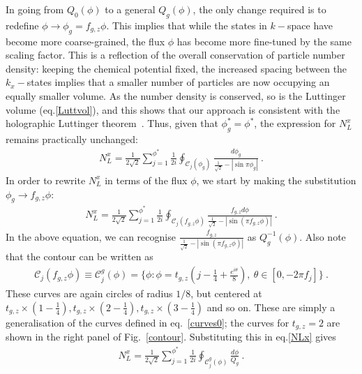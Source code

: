 In going from \(Q_0(\phi)\) to a general \(Q_g(\phi)\), the only change required is to redefine \(\phi \to \phi_g = f_{g,z}\phi\). This implies that while the states in \(k-\)space have become more coarse-grained, the flux \(\phi\) has become more fine-tuned by the same scaling factor.
This is a reflection of the overall conservation of particle number density: keeping the chemical potential fixed, the increased spacing between the \(k_x-\)states implies that a smaller number of particles are now occupying an equally smaller volume. As the number density is conserved, so is the Luttinger volume (eq.\eqref{Luttvol}), and this shows that our approach is consistent with the holographic Luttinger theorem~\cite{sachdev_2011}. Thus, given that \(\phi_g^* = \phi^*\), the expression for \(N_L^x\) remains practically unchanged:
\begin{equation}\begin{aligned}
	N_L^x = \frac{1}{2\sqrt 2}\sum_{j=1}^{\phi^*}\frac{1}{2 i}\oint_{\mathcal{C}_j(\phi_g)} \frac{d\phi_g}{\frac{1}{\sqrt 2} - |\sin \pi \phi_g|}~.
\end{aligned}\end{equation}
In order to rewrite $N_L^x$ in terms of the flux \(\phi\), we start by making the substitution \(\phi_g \to f_{g,z}\phi\):
\begin{equation}\label{NLx}\begin{aligned}
	N_L^x = \frac{1}{2\sqrt 2}\sum_{j=1}^{\phi^*}\frac{1}{2 i}\oint_{\mathcal{C}_j(f_{g,z}\phi)} \frac{f_{g,z} d\phi}{\frac{1}{\sqrt 2} - |\sin \left( \pi f_{g,z}\phi\right)| }~.
\end{aligned}\end{equation}
In the above equation, we can recognise  \(\frac{f_{g,z} }{\frac{1}{\sqrt 2} - |\sin \left( \pi f_{g,z}\phi\right)|}\) as \(Q_g^{-1}(\phi)\).
Also note that the contour can be written as
\begin{equation}\begin{aligned}
	\mathcal{C}_j(f_{g,z}\phi) \equiv \mathcal{C}^g_j(\phi) = \bigg\{\phi:\phi = t_{g,z}\left( j - \frac{1}{4} + \frac{e^{i\theta}}{8} \right),~\theta \in \left[0, -2\pi f_j\right]\bigg\}~.
\end{aligned}\end{equation}
These curves are again circles of radius \(1/8\), but centered at \(t_{g,z}\times \left( 1 - \frac{1}{4} \right) ,t_{g,z}\times \left( 2 - \frac{1}{4} \right) ,t_{g,z}\times \left( 3 - \frac{1}{4} \right) \) and so on. These are simply a generalisation of the curves defined in eq.~\eqref{curves0}; the curves for \(t_{g,z}=2\) are shown in the right panel of Fig.~\ref{contour}.
Substituting this in eq.\eqref{NLx} gives
\begin{equation}\begin{aligned}
	\label{Lut_volume}
	N_L^x = \frac{1}{2\sqrt 2}\sum_{j=1}^{\phi^*}\frac{1}{2 i}\oint_{\mathcal{C}_j^g(\phi)} \frac{d\phi}{Q_g}~.
\end{aligned}\end{equation}

